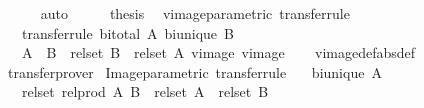 \begin{isabellebody}
\ \ \ \ \isamarkupfalse%
\ auto\isanewline
\ \ \isamarkupfalse%
\ \isamarkupfalse%
\ {\isacharquery}{\kern0pt}thesis\ \isacommand{{\isachardot}{\kern0pt}}\isamarkupfalse%
\isanewline
{}\isamarkupfalse%
%
\endisatagproof
{\isafoldproof}%
%
\isadelimproof
\isanewline
%
\endisadelimproof
\isanewline
{}\isamarkupfalse%
\isanewline
\isanewline
{}\isamarkupfalse%
\ vimage{\isacharunderscore}{\kern0pt}parametric\ {\isacharbrackleft}{\kern0pt}transfer{\isacharunderscore}{\kern0pt}rule{\isacharbrackright}{\kern0pt}{\isacharcolon}{\kern0pt}\isanewline
\ \ \ {\isacharbrackleft}{\kern0pt}transfer{\isacharunderscore}{\kern0pt}rule{\isacharbrackright}{\kern0pt}{\isacharcolon}{\kern0pt}\ {\isachardoublequoteopen}bi{\isacharunderscore}{\kern0pt}total\ A{\isachardoublequoteclose}\ {\isachardoublequoteopen}bi{\isacharunderscore}{\kern0pt}unique\ B{\isachardoublequoteclose}\isanewline
\ \ \ {\isachardoublequoteopen}{\isacharparenleft}{\kern0pt}{\isacharparenleft}{\kern0pt}A\ {\isacharequal}{\kern0pt}{\isacharequal}{\kern0pt}{\isacharequal}{\kern0pt}{\isachargreater}{\kern0pt}\ B{\isacharparenright}{\kern0pt}\ {\isacharequal}{\kern0pt}{\isacharequal}{\kern0pt}{\isacharequal}{\kern0pt}{\isachargreater}{\kern0pt}\ rel{\isacharunderscore}{\kern0pt}set\ B\ {\isacharequal}{\kern0pt}{\isacharequal}{\kern0pt}{\isacharequal}{\kern0pt}{\isachargreater}{\kern0pt}\ rel{\isacharunderscore}{\kern0pt}set\ A{\isacharparenright}{\kern0pt}\ vimage\ vimage{\isachardoublequoteclose}\isanewline
%
\isadelimproof
\ \ %
\endisadelimproof
%
\isatagproof
{}\isamarkupfalse%
\ vimage{\isacharunderscore}{\kern0pt}def{\isacharbrackleft}{\kern0pt}abs{\isacharunderscore}{\kern0pt}def{\isacharbrackright}{\kern0pt}\ \isamarkupfalse%
\ transfer{\isacharunderscore}{\kern0pt}prover%
\endisatagproof
{\isafoldproof}%
%
\isadelimproof
\isanewline
%
\endisadelimproof
\isanewline
{}\isamarkupfalse%
\ Image{\isacharunderscore}{\kern0pt}parametric\ {\isacharbrackleft}{\kern0pt}transfer{\isacharunderscore}{\kern0pt}rule{\isacharbrackright}{\kern0pt}{\isacharcolon}{\kern0pt}\isanewline
\ \ \ {\isachardoublequoteopen}bi{\isacharunderscore}{\kern0pt}unique\ A{\isachardoublequoteclose}\isanewline
\ \ \ {\isachardoublequoteopen}{\isacharparenleft}{\kern0pt}rel{\isacharunderscore}{\kern0pt}set\ {\isacharparenleft}{\kern0pt}rel{\isacharunderscore}{\kern0pt}prod\ A\ B{\isacharparenright}{\kern0pt}\ {\isacharequal}{\kern0pt}{\isacharequal}{\kern0pt}{\isacharequal}{\kern0pt}{\isachargreater}{\kern0pt}\ rel{\isacharunderscore}{\kern0pt}set\ A\ {\isacharequal}{\kern0pt}{\isacharequal}{\kern0pt}{\isacharequal}{\kern0pt}{\isachargreater}{\kern0pt}\ rel{\isacharunderscore}{\kern0pt}set\ B{\isacharparenright}{\kern0pt}\ {\isacharparenleft}{\kern0pt}{\isacharbackquote}{\kern0pt}{\isacharbackquote}{\kern0pt}{\isacharparenright}{\kern0pt}\ {\isacharparenleft}{\kern0pt}{\isacharbackquote}{\kern0pt}{\isacharbackquote}{\kern0pt}{\isacharparenright}{\kern0pt}{\isachardoublequoteclose}\isanewline

\end{isabellebody}
